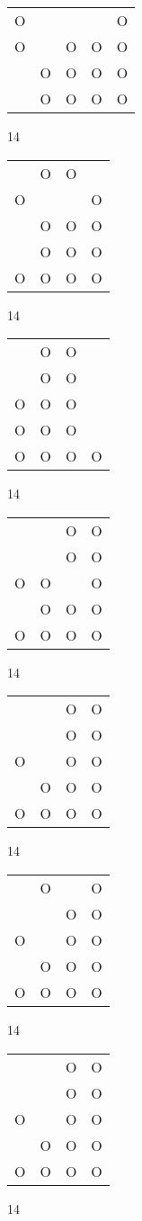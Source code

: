 \begin{tabular}{|m{0.2cm}m{0.2cm}m{0.2cm}m{0.2cm}m{0.2cm}|}\hline
O& & & &O\\
O& &O&O&O\\
 &O&O&O&O\\
 &O&O&O&O\\
\hline\end{tabular}14
\begin{tabular}{|m{0.2cm}m{0.2cm}m{0.2cm}m{0.2cm}|}\hline
 &O&O& \\
O& & &O\\
 &O&O&O\\
 &O&O&O\\
O&O&O&O\\
\hline\end{tabular}14
\begin{tabular}{|m{0.2cm}m{0.2cm}m{0.2cm}m{0.2cm}|}\hline
 &O&O& \\
 &O&O& \\
O&O&O& \\
O&O&O& \\
O&O&O&O\\
\hline\end{tabular}14
\begin{tabular}{|m{0.2cm}m{0.2cm}m{0.2cm}m{0.2cm}|}\hline
 & &O&O\\
 & &O&O\\
O&O& &O\\
 &O&O&O\\
O&O&O&O\\
\hline\end{tabular}14
\begin{tabular}{|m{0.2cm}m{0.2cm}m{0.2cm}m{0.2cm}|}\hline
 & &O&O\\
 & &O&O\\
O& &O&O\\
 &O&O&O\\
O&O&O&O\\
\hline\end{tabular}14
\begin{tabular}{|m{0.2cm}m{0.2cm}m{0.2cm}m{0.2cm}|}\hline
 &O& &O\\
 & &O&O\\
O& &O&O\\
 &O&O&O\\
O&O&O&O\\
\hline\end{tabular}14
\begin{tabular}{|m{0.2cm}m{0.2cm}m{0.2cm}m{0.2cm}|}\hline
 & &O&O\\
 & &O&O\\
O& &O&O\\
 &O&O&O\\
O&O&O&O\\
\hline\end{tabular}14
